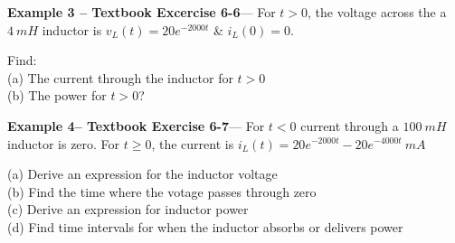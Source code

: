 \documentclass{handout}
\begin{document}
\textbf{Example 3 -- Textbook Excercise 6-6}--- For $t>0$, the voltage across the a $4\ mH$ inductor is $v_L(t) = 20e^{-2000t}$ \& $i_L(0) = 0$.  

Find:\\
(a) The current through the inductor for $t>0$ \\
(b) The power for $t>0$?


\newpage
\clearpage
\pagebreak

\textbf{Example 4-- Textbook Exercise 6-7}--- For $t<0$ current through a $100\ mH$ inductor is zero.  For $t\ge 0$, the current is $i_L(t) = 20e^{-2000t}-20e^{-4000t}\ mA$

(a) Derive an expression for the inductor voltage\\
(b) Find the time where the votage passes through zero\\
(c) Derive an expression for inductor power\\
(d) Find time intervals for when the inductor absorbs or delivers power\\
\end{document}
